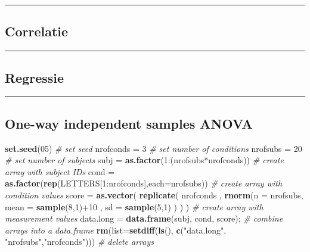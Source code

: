 \documentclass[]{article}
\newenvironment{Shaded}{\begin{snugshade}}{\end{snugshade}}
\newcommand{\KeywordTok}[1]{\textcolor[rgb]{0.13,0.29,0.53}{\textbf{{#1}}}}
\newcommand{\DataTypeTok}[1]{\textcolor[rgb]{0.13,0.29,0.53}{{#1}}}
\newcommand{\DecValTok}[1]{\textcolor[rgb]{0.00,0.00,0.81}{{#1}}}
\newcommand{\StringTok}[1]{\textcolor[rgb]{0.31,0.60,0.02}{{#1}}}
\newcommand{\CommentTok}[1]{\textcolor[rgb]{0.56,0.35,0.01}{\textit{{#1}}}}
\newcommand{\NormalTok}[1]{{#1}}
\begin{document}
\begin{center}\rule{0.5\linewidth}{\linethickness}\end{center}

\newpage

\subsection{Correlatie}\label{correlatie}

\begin{center}\rule{0.5\linewidth}{\linethickness}\end{center}

\newpage

\subsection{Regressie}\label{regressie}

\begin{center}\rule{0.5\linewidth}{\linethickness}\end{center}

\newpage

\subsection{One-way independent samples
ANOVA}\label{one-way-independent-samples-anova}

\begin{Shaded}
\begin{Highlighting}[]
\KeywordTok{set.seed}\NormalTok{(}\DecValTok{05}\NormalTok{)   }\CommentTok{# set seed}
\NormalTok{nrofconds =}\StringTok{ }\DecValTok{3}  \CommentTok{# set number of conditions}
\NormalTok{nrofsubs  =}\StringTok{ }\DecValTok{20} \CommentTok{# set number of subjects}
\NormalTok{subj =}\StringTok{ }\KeywordTok{as.factor}\NormalTok{(}\DecValTok{1}\NormalTok{:(nrofsubs*nrofconds))      }\CommentTok{# create array with subject IDs}
\NormalTok{cond =}\StringTok{ }\KeywordTok{as.factor}\NormalTok{(}\KeywordTok{rep}\NormalTok{(LETTERS[}\DecValTok{1}\NormalTok{:nrofconds],}\DataTypeTok{each=}\NormalTok{nrofsubs))   }\CommentTok{# create array with condition values}
\NormalTok{score =}\StringTok{ }\KeywordTok{as.vector}\NormalTok{( }\KeywordTok{replicate}\NormalTok{(}
          \NormalTok{nrofconds , }\KeywordTok{rnorm}\NormalTok{(}\DataTypeTok{n =} \NormalTok{nrofsubs, }\DataTypeTok{mean =} \KeywordTok{sample}\NormalTok{(}\DecValTok{8}\NormalTok{,}\DecValTok{1}\NormalTok{)+}\DecValTok{10} \NormalTok{, }\DataTypeTok{sd =} \KeywordTok{sample}\NormalTok{(}\DecValTok{5}\NormalTok{,}\DecValTok{1}\NormalTok{) ) }
        \NormalTok{) )                                     }\CommentTok{# create array with measurement values}
\NormalTok{data.long =}\StringTok{ }\KeywordTok{data.frame}\NormalTok{(subj, cond, score);      }\CommentTok{# combine arrays into a data.frame}
\KeywordTok{rm}\NormalTok{(}\DataTypeTok{list=}\KeywordTok{setdiff}\NormalTok{(}\KeywordTok{ls}\NormalTok{(), }\KeywordTok{c}\NormalTok{(}\StringTok{"data.long"}\NormalTok{, }\StringTok{"nrofsubs"}\NormalTok{,}\StringTok{"nrofconds"}\NormalTok{))) }\CommentTok{# delete arrays}
\end{Highlighting}
\end{Shaded}
\end{document}
